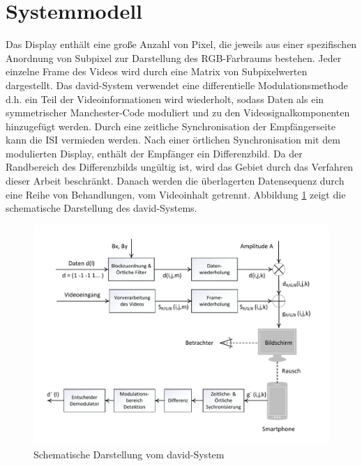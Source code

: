 \section{Systemmodell} 
Das Display enthält eine große Anzahl von Pixel, die jeweils aus einer spezifischen Anordnung von Subpixel zur Darstellung des RGB-Farbraums bestehen. Jeder einzelne Frame des Videos wird durch eine Matrix von Subpixelwerten dargestellt. Das \gls{david}-System verwendet eine differentielle Modulationsmethode d.h. ein Teil der Videoinformationen wird wiederholt, sodass Daten als ein symmetrischer Manchester-Code moduliert und zu den Videosignalkomponenten hinzugefügt werden. Durch eine zeitliche Synchronisation der Empfängerseite kann die \gls{ISI} vermieden werden. Nach einer örtlichen Synchronisation mit dem modulierten Display, enthält der Empfänger ein Differenzbild. Da der Randbereich des Differenzbilds ungültig ist, wird das Gebiet durch das Verfahren dieser Arbeit beschränkt. Danach werden die überlagerten Datensequenz durch eine Reihe von Behandlungen, vom Videoinhalt getrennt. Abbildung \ref{fig:David2} zeigt die schematische Darstellung des \gls{david}-Systems. 
\vspace{18pt}

\begin{figure}[H]
	\centering 
	\includegraphics[keepaspectratio,width=1.0\textwidth]{images/2_DaViD/Systemmodell.pdf}
	\caption{Schematische Darstellung vom \gls{david}-System}
	\label{fig:David2}
\end{figure}


